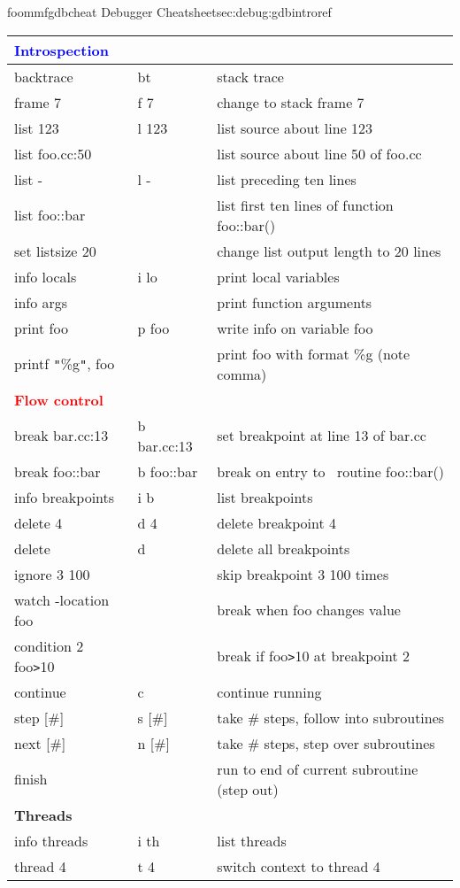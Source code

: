 \begin{codelisting}{f}{oommfgdbcheat}{ Debugger
    Cheatsheet\HTMLoutput{\phantom{\rule{1pt}{1.5\baselineskip}}}}{sec:debug:gdbintro}{ref}
\begin{center}
\begin{tabular}{|l|l|l|}
  \multicolumn{3}{|l|}{
  \rule{0pt}{2.5ex}\textcolor{blue}{\textbf{Introspection}}}\\\hline
  backtrace & bt & stack trace\\
  frame 7 & f 7 & change to stack frame 7\\
  list 123 & l 123 & list source about line 123\\
  list foo.cc:50 & & list source about line 50 of foo.cc\\
  list - & l - & list preceding ten lines\\
  list foo::bar & & list first ten lines of function foo::bar()\\
  set listsize 20 & & change list output length to 20 lines\\
  info locals & i lo & print local variables\\
  info args  & & print function arguments\\
  print foo & p foo & write info on variable foo\\
  printf \verb+"+\%g\verb+"+, foo &
    & print foo with format \%g (note comma)\\[0.5ex]\hline

  \multicolumn{3}{|l|}{
    \rule{0pt}{2.5ex}\textcolor{red}{\textbf{Flow control}}}\\\hline
  break bar.cc:13 & b bar.cc:13
    & set breakpoint at line 13 of bar.cc\\
  break foo::bar
  & b foo::bar & break on entry to \Cplusplus\ routine foo::bar()\\
  info breakpoints & i b & list breakpoints\\
  delete 4 & d 4 & delete breakpoint 4\\
  delete & d & delete all breakpoints\\
  ignore 3 100 & & skip breakpoint 3 100 times\\
  watch -location foo & & break when foo changes value\\
  condition 2 foo\verb+>+10 & & break if foo\verb+>+10 at breakpoint 2\\
  continue & c & continue running\\
  step [\#] & s [\#] & take \# steps, follow into subroutines\\
  next [\#] & n [\#] & take \# steps, step over subroutines\\
  finish & & run to end of current subroutine (step out)\\[0.5ex]\hline

  \multicolumn{3}{|l|}{
    \rule{0pt}{2.5ex}\textcolor[rgb]{0.6,0,0.9}{\textbf{Threads}}}\\\hline
  info threads & i th & list threads\\
  thread 4 & t 4 & switch context to thread 4\\\hline
  \end{tabular}
  \end{center}\html{\newline}
\end{codelisting}
